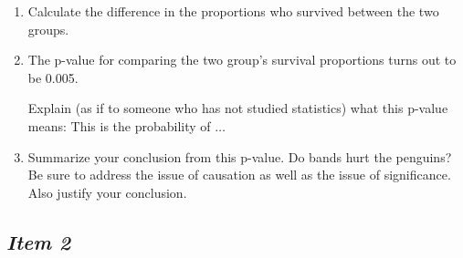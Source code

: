 \begin{enumerate} [leftmargin=1cm, itemsep=.2em]


\item Calculate the difference in the proportions who survived between the two groups.

















%




%
























\item The p-value for comparing the two group's survival proportions turns out to be 0.005.


Explain (as if to someone who has not studied statistics) what this p-value means: This is the probability of $\ldots$





\item Summarize your conclusion from this p-value. Do bands hurt the penguins? Be sure to address the issue of causation as well as the issue of significance. Also justify your conclusion.


\end{enumerate}








\subsection{\textbf{\textit{Item 2}}}


